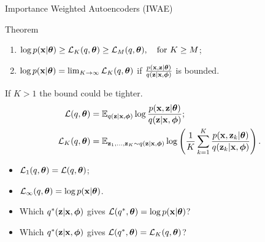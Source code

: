 \begin{frame}{Importance Weighted Autoencoders (IWAE)}
	\begin{block}{Theorem}
		\begin{enumerate}
			\item $\log p(\mathbf{x} | \boldsymbol{\theta}) \geq \mathcal{L}_K (q, \boldsymbol{\theta}) \geq \mathcal{L}_M (q, \boldsymbol{\theta}), \quad \text{for } K \geq M$;
			\item $\log p(\mathbf{x} | \boldsymbol{\theta}) = \lim_{K \rightarrow \infty} \mathcal{L}_K (q, \boldsymbol{\theta})$ if $\frac{p(\mathbf{x}, \mathbf{z} | \boldsymbol{\theta})}{q(\mathbf{z} | \mathbf{x}, \boldsymbol{\phi})}$ is bounded.
		\end{enumerate}
		\vspace{-0.2cm}
	\end{block}
	If $K > 1$ the bound could be tighter.
	\begin{align*}
		\mathcal{L} (q, \boldsymbol{\theta}) &= \mathbb{E}_{q(\mathbf{z} | \mathbf{x}, \boldsymbol{\phi})} \log \frac{p(\mathbf{x}, \mathbf{z} | \boldsymbol{\theta})}{q(\mathbf{z}| \mathbf{x}, \boldsymbol{\phi})}; \\
		\mathcal{L}_K (q, \boldsymbol{\theta}) &= \mathbb{E}_{\mathbf{z}_1, \dots, \mathbf{z}_K \sim q(\mathbf{z} | \mathbf{x}, \boldsymbol{\phi})} \log \left( \frac{1}{K}\sum_{k=1}^K\frac{p(\mathbf{x}, \mathbf{z}_k | \boldsymbol{\theta})}{q(\mathbf{z}_k| \mathbf{x}, \boldsymbol{\phi})} \right).
	\end{align*}
	\vspace{-0.2cm}
	\begin{itemize}
		\item $\mathcal{L}_1(q, \boldsymbol{\theta}) = \mathcal{L}(q, \boldsymbol{\theta})$;
		\item $\mathcal{L}_{\infty}(q, \boldsymbol{\theta}) = \log p(\mathbf{x} | \boldsymbol{\theta})$.
		\item Which $q^*(\mathbf{z} | \mathbf{x}, \boldsymbol{\phi})$ gives $\mathcal{L}(q^*, \boldsymbol{\theta}) = \log p(\mathbf{x} | \boldsymbol{\theta})$? 
		\item Which $q^*(\mathbf{z} | \mathbf{x}, \boldsymbol{\phi})$ gives $\mathcal{L}(q^*, \boldsymbol{\theta}) = \mathcal{L}_K(q, \boldsymbol{\theta})$?
	\end{itemize}

\end{frame}

